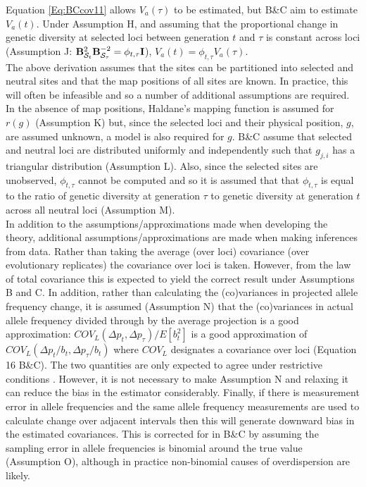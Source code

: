 \documentclass[12pt]{article}
\begin{document}
\begin{bibunit}
Equation \ref{Eq:BCcov11} allows $V_a(\tau)$ to be estimated, but B\&C aim to estimate $V_a(t)$.  Under Assumption H, and assuming that the proportional change in genetic diversity at selected loci between generation $t$ and $\tau$ is constant across loci (Assumption J: ${\bf B}_{\mathcal{S}_t}^2{\bf B}_{\mathcal{S}_\tau}^{-2} = \phi_{t,\tau}{\bf I}$), $V_a(t)=\phi_{t,\tau} V_a(\tau)$.\\ 

The above derivation assumes that the sites can be partitioned into selected and neutral sites and that the map positions of all sites are known.  In practice, this will often be infeasible and so a number of additional assumptions are required. In the absence of map positions, Haldane's \citeyearpar{haldane1919map} mapping function is assumed for $r(g)$ (Assumption K) but, since the selected loci and their physical position, $g$, are assumed unknown, a model is also required for $g$. B\&C assume that selected and neutral loci are distributed uniformly and independently such that $g_{j,i}$ has a triangular distribution (Assumption L). Also, since the selected sites are unobserved, $\phi_{t,\tau}$ cannot be computed and so it is assumed that that $\phi_{t,\tau}$ is equal to the ratio of genetic diversity at generation $\tau$ to genetic diversity at generation $t$ across all neutral loci (Assumption M). \\ 
 
In addition to the assumptions/approximations made when developing the theory, additional assumptions/approximations are made when making inferences from data.  Rather than taking the average (over loci) covariance (over evolutionary replicates) the covariance over loci is taken. However, from the law of total covariance this is expected to yield the correct result under Assumptions B and C. In addition, rather than calculating the (co)variances in projected allele frequency change, it is assumed (Assumption N) that the (co)variances in actual allele frequency divided through by the average projection is a good approximation: $COV_{L}(\Delta p_{t}, \Delta p_{\tau})/E[b_t^2]$ is a good approximation of $COV_{L}(\Delta p_{t}/b_{t}, \Delta p_{\tau}/b_{t})$ where $ COV_L$ designates a covariance over loci (Equation 16 B\&C). The two quantities are only expected to agree under restrictive conditions \citep{Bohrnstedt.1969}. However, it is not necessary to make Assumption N and relaxing it can reduce the bias in the estimator considerably. Finally, if there is measurement error in allele frequencies and the same allele frequency measurements are used to calculate change over adjacent intervals then this will generate downward bias in the estimated covariances. This is corrected for in B\&C by assuming the sampling error in allele frequencies is binomial around the true value (Assumption O), although in practice non-binomial causes of overdispersion are likely.\\ 


\end{bibunit}
\end{document}
